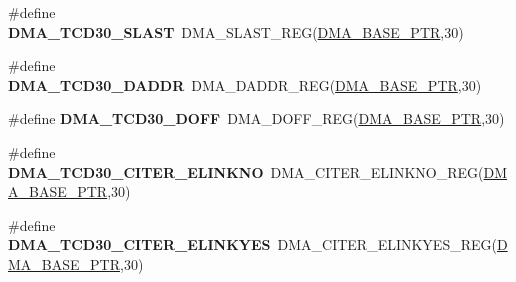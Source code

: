 \begin{DoxyCompactItemize}
\item 
\hypertarget{group___d_m_a___register___accessor___macros_ga0053199c712e726beafca67fcce0935a}{}\#define {\bfseries D\+M\+A\+\_\+\+T\+C\+D30\+\_\+\+S\+L\+A\+S\+T}~D\+M\+A\+\_\+\+S\+L\+A\+S\+T\+\_\+\+R\+E\+G(\hyperlink{group___d_m_a___peripheral_ga6997fbc1b1973e9f27170217a3bd6f22}{D\+M\+A\+\_\+\+B\+A\+S\+E\+\_\+\+P\+T\+R},30)\label{group___d_m_a___register___accessor___macros_ga0053199c712e726beafca67fcce0935a}

\item 
\hypertarget{group___d_m_a___register___accessor___macros_gadda567317e662ddc776b62a9d57aed00}{}\#define {\bfseries D\+M\+A\+\_\+\+T\+C\+D30\+\_\+\+D\+A\+D\+D\+R}~D\+M\+A\+\_\+\+D\+A\+D\+D\+R\+\_\+\+R\+E\+G(\hyperlink{group___d_m_a___peripheral_ga6997fbc1b1973e9f27170217a3bd6f22}{D\+M\+A\+\_\+\+B\+A\+S\+E\+\_\+\+P\+T\+R},30)\label{group___d_m_a___register___accessor___macros_gadda567317e662ddc776b62a9d57aed00}

\item 
\hypertarget{group___d_m_a___register___accessor___macros_gad9be4926d01735718aceaeada86e4d89}{}\#define {\bfseries D\+M\+A\+\_\+\+T\+C\+D30\+\_\+\+D\+O\+F\+F}~D\+M\+A\+\_\+\+D\+O\+F\+F\+\_\+\+R\+E\+G(\hyperlink{group___d_m_a___peripheral_ga6997fbc1b1973e9f27170217a3bd6f22}{D\+M\+A\+\_\+\+B\+A\+S\+E\+\_\+\+P\+T\+R},30)\label{group___d_m_a___register___accessor___macros_gad9be4926d01735718aceaeada86e4d89}

\item 
\hypertarget{group___d_m_a___register___accessor___macros_ga4560b490b6938b940cb730c67b363bcf}{}\#define {\bfseries D\+M\+A\+\_\+\+T\+C\+D30\+\_\+\+C\+I\+T\+E\+R\+\_\+\+E\+L\+I\+N\+K\+N\+O}~D\+M\+A\+\_\+\+C\+I\+T\+E\+R\+\_\+\+E\+L\+I\+N\+K\+N\+O\+\_\+\+R\+E\+G(\hyperlink{group___d_m_a___peripheral_ga6997fbc1b1973e9f27170217a3bd6f22}{D\+M\+A\+\_\+\+B\+A\+S\+E\+\_\+\+P\+T\+R},30)\label{group___d_m_a___register___accessor___macros_ga4560b490b6938b940cb730c67b363bcf}

\item 
\hypertarget{group___d_m_a___register___accessor___macros_ga1e33349fd3a5ced5710c4f171a1b4bae}{}\#define {\bfseries D\+M\+A\+\_\+\+T\+C\+D30\+\_\+\+C\+I\+T\+E\+R\+\_\+\+E\+L\+I\+N\+K\+Y\+E\+S}~D\+M\+A\+\_\+\+C\+I\+T\+E\+R\+\_\+\+E\+L\+I\+N\+K\+Y\+E\+S\+\_\+\+R\+E\+G(\hyperlink{group___d_m_a___peripheral_ga6997fbc1b1973e9f27170217a3bd6f22}{D\+M\+A\+\_\+\+B\+A\+S\+E\+\_\+\+P\+T\+R},30)\label{group___d_m_a___register___accessor___macros_ga1e33349fd3a5ced5710c4f171a1b4bae}


\end{DoxyCompactItemize}
